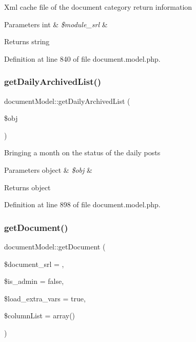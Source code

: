 Xml cache file of the document category return information 
\begin{DoxyParams}[1]{Parameters}
int & {\em \$module\+\_\+srl} & \\
\hline
\end{DoxyParams}
\begin{DoxyReturn}{Returns}
string 
\end{DoxyReturn}


Definition at line 840 of file document.\+model.\+php.

\hypertarget{classdocumentModel_a9f7ad689da9b5a7b8f75fa2e48aec80a}{}\label{classdocumentModel_a9f7ad689da9b5a7b8f75fa2e48aec80a} 
\subsubsection{\texorpdfstring{get\+Daily\+Archived\+List()}{getDailyArchivedList()}}
{\footnotesize\ttfamily document\+Model\+::get\+Daily\+Archived\+List (\begin{DoxyParamCaption}\item[{}]{\$obj }\end{DoxyParamCaption})}

Bringing a month on the status of the daily posts 
\begin{DoxyParams}[1]{Parameters}
object & {\em \$obj} & \\
\hline
\end{DoxyParams}
\begin{DoxyReturn}{Returns}
object 
\end{DoxyReturn}


Definition at line 898 of file document.\+model.\+php.

\hypertarget{classdocumentModel_a8846291323aaa3b090e7b8317f8175f2}{}\label{classdocumentModel_a8846291323aaa3b090e7b8317f8175f2} 
\subsubsection{\texorpdfstring{get\+Document()}{getDocument()}}
{\footnotesize\ttfamily document\+Model\+::get\+Document (\begin{DoxyParamCaption}\item[{}]{\$document\+\_\+srl = {},  }\item[{}]{\$is\+\_\+admin = {\ttfamily false},  }\item[{}]{\$load\+\_\+extra\+\_\+vars = {\ttfamily true},  }\item[{}]{\$column\+List = {\ttfamily array()} }\end{DoxyParamCaption})}

